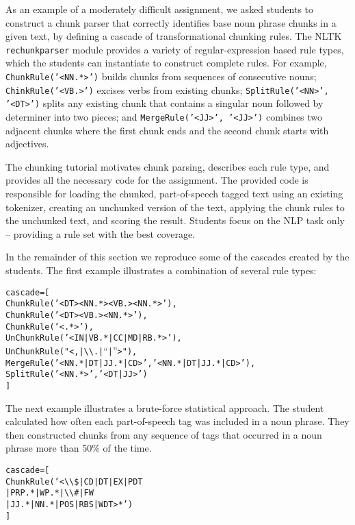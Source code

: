 \documentclass[11pt]{article}
\newenvironment{sv}{\scriptsize\begin{alltt}}{\end{alltt}\normalsize}
\begin{document}
As an example of a moderately difficult assignment, we asked students
to construct a chunk parser that correctly identifies base noun phrase
chunks in a given text, by defining a cascade of transformational
chunking rules.  The NLTK \texttt{rechunkparser} module provides a
variety of regular-expression based rule types, which the students can
instantiate to construct complete rules.  For example,
\texttt{ChunkRule('<NN.*>')} builds chunks from sequences of
consecutive nouns; \texttt{ChinkRule('<VB.>')} excises verbs from
existing chunks; \texttt{SplitRule('<NN>', '<DT>')} splits any
existing chunk that contains a singular noun followed by determiner
into two pieces; and \texttt{MergeRule('<JJ>', '<JJ>')} combines two
adjacent chunks where the first chunk ends and the second chunk starts
with adjectives.

The chunking tutorial motivates chunk parsing, describes each rule
type, and provides all the necessary code for the assignment.  The
provided code is responsible for loading the chunked, part-of-speech
tagged text using an existing tokenizer, creating an unchunked version
of the text, applying the chunk rules to the unchunked text, and
scoring the result.  Students focus on the NLP task only -- providing
a rule set with the best coverage.

In the remainder of this section we reproduce some of the cascades
created by the students.  The first example illustrates a combination
of several rule types:

\begin{sv}
cascade = [
  ChunkRule('<DT><NN.*><VB.><NN.*>'),
  ChunkRule('<DT><VB.><NN.*>'),
  ChunkRule('<.*>'),
  UnChunkRule('<IN|VB.*|CC|MD|RB.*>'),
  UnChunkRule("<,|{\textbackslash}{\textbackslash}.|``|''>"),
  MergeRule('<NN.*|DT|JJ.*|CD>', '<NN.*|DT|JJ.*|CD>'),
  SplitRule('<NN.*>', '<DT|JJ>')
]
\end{sv}

The next example illustrates a brute-force statistical approach.  The
student calculated how often each part-of-speech tag was included in a
noun phrase.  They then constructed chunks from any sequence of tags
that occurred in a noun phrase more than 50\% of the time.

\begin{sv}
cascade = [
  ChunkRule('<{\textbackslash}{\textbackslash}\$|CD|DT|EX|PDT
             |PRP.*|WP.*|{\textbackslash}{\textbackslash}\#|FW
             |JJ.*|NN.*|POS|RBS|WDT>*')
]
\end{sv}
\end{document}
